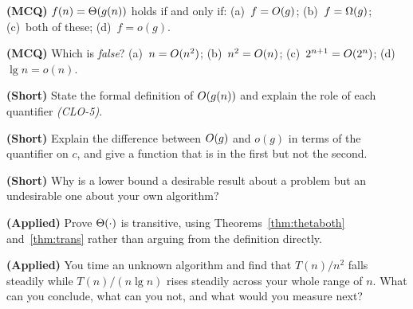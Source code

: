 \begin{reviewq}
  \item \textbf{(MCQ)} $f(n) = \Theta(g(n))$ holds if and only if:
        (a)~$f = O(g)$; (b)~$f = \Omega(g)$; (c)~both of these;
        (d)~$f = o(g)$.
  \item \textbf{(MCQ)} Which is \emph{false}? (a)~$n = O(n^{2})$;
        (b)~$n^{2} = O(n)$; (c)~$2^{n+1} = O(2^{n})$;
        (d)~$\lg n = o(n)$.
  \item \textbf{(Short)} State the formal definition of $O(g(n))$ and
        explain the role of each quantifier \emph{(CLO-5)}.
  \item \textbf{(Short)} Explain the difference between $O(g)$ and $o(g)$
        in terms of the quantifier on $c$, and give a function that is in the
        first but not the second.
  \item \textbf{(Short)} Why is a lower bound a desirable result about a
        problem but an undesirable one about your own algorithm?
  \item \textbf{(Applied)} Prove $\Theta(\cdot)$ is transitive, using
        Theorems~\ref{thm:thetaboth} and~\ref{thm:trans} rather than arguing
        from the definition directly.
  \item \textbf{(Applied)} You time an unknown algorithm and find that
        $T(n)/n^{2}$ falls steadily while $T(n)/(n\lg n)$ rises steadily across
        your whole range of $n$. What can you conclude, what can you not, and
        what would you measure next?
\end{reviewq}
